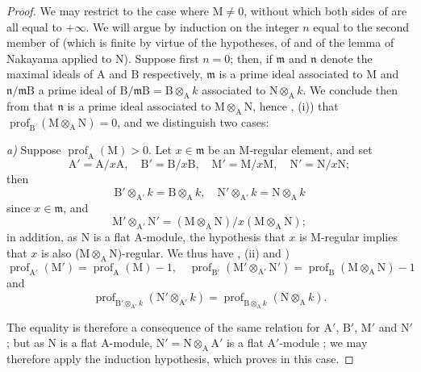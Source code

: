 \begin{proof}
We may restrict to the case where $\mathrm{M}\neq 0$, without which both sides of  are all equal to $+\infty$.
We will argue by induction on the integer $n$ equal to the second member of  (which is finite by virtue of the hypotheses, of  and of the lemma of Nakayama applied to $\mathrm{N}$).
Suppose first $n=0$; then, if $\mathfrak{m}$ and $\mathfrak{n}$ denote the maximal ideals of $\mathrm{A}$ and $\mathrm{B}$ respectively, $\mathfrak{m}$ is a prime ideal associated to $\mathrm{M}$ and $\mathfrak{n}/\mathfrak{m}\mathrm{B}$ a prime ideal of $\mathrm{B}/\mathfrak{m}\mathrm{B}=\mathrm{B}\otimes_\mathrm{A} k$ associated to $\mathrm{N}\otimes_\mathrm{A} k$.
We conclude then from  that $\mathfrak{n}$ is a prime ideal associated to $\mathrm{M}\otimes_\mathrm{A}\mathrm{N}$, hence , (i)) that $\operatorname{prof}_\mathrm{B}(\mathrm{M}\otimes_\mathrm{A}\mathrm{N})=0$, and we distinguish two cases:

\emph{a)} Suppose $\operatorname{prof}_\mathrm{A}(\mathrm{M})>0$.
Let $x\in\mathfrak{m}$ be an M-regular element, and set
\[
  \mathrm{A}'=\mathrm{A}/x\mathrm{A},\quad\mathrm{B}'=\mathrm{B}/x\mathrm{B},\quad\mathrm{M}'=\mathrm{M}/x\mathrm{M},\quad\mathrm{N}'=\mathrm{N}/x\mathrm{N};
\]
then
\[
  \mathrm{B}'\otimes_{\mathrm{A}'}k=\mathrm{B}\otimes_\mathrm{A} k,\quad \mathrm{N}'\otimes_{\mathrm{A}'}k=\mathrm{N}\otimes_\mathrm{A} k
\]
since $x\in\mathfrak{m}$, and
\[
  \mathrm{M}'\otimes_{\mathrm{A}'}\mathrm{N}'=(\mathrm{M}\otimes_\mathrm{A}\mathrm{N})/x(\mathrm{M}\otimes_\mathrm{A}\mathrm{N});
\]
in addition, as $\mathrm{N}$ is a flat $\mathrm{A}$-module, the hypothesis that $x$ is M-regular implies that $x$ is also ($\mathrm{M}\otimes_\mathrm{A}\mathrm{N}$)-regular.
We thus have , (ii) and )
\[
  \operatorname{prof}_{\mathrm{A}'}(\mathrm{M}')=\operatorname{prof}_\mathrm{A}(\mathrm{M})-1,\quad \operatorname{prof}_{\mathrm{B}'}(\mathrm{M}'\otimes_{\mathrm{A}'}\mathrm{N}')=\operatorname{prof}_\mathrm{B}(\mathrm{M}\otimes_\mathrm{A}\mathrm{N})-1
\]
and
\[
  \operatorname{prof}_{\mathrm{B}'\otimes_{\mathrm{A}'}k}(\mathrm{N}'\otimes_{\mathrm{A}'}k)=\operatorname{prof}_{\mathrm{B}\otimes_\mathrm{A} k}(\mathrm{N}\otimes_\mathrm{A} k).
\]

The equality  is therefore a consequence of the same relation for $\mathrm{A}'$, $\mathrm{B}'$, $\mathrm{M}'$ and $\mathrm{N}'$; but as $\mathrm{N}$ is a flat $\mathrm{A}$-module, $\mathrm{N}'=\mathrm{N}\otimes_\mathrm{A}\mathrm{A}'$ is a flat $\mathrm{A}'$-module ; we may therefore apply the induction hypothesis, which proves  in this case.


\end{proof}
